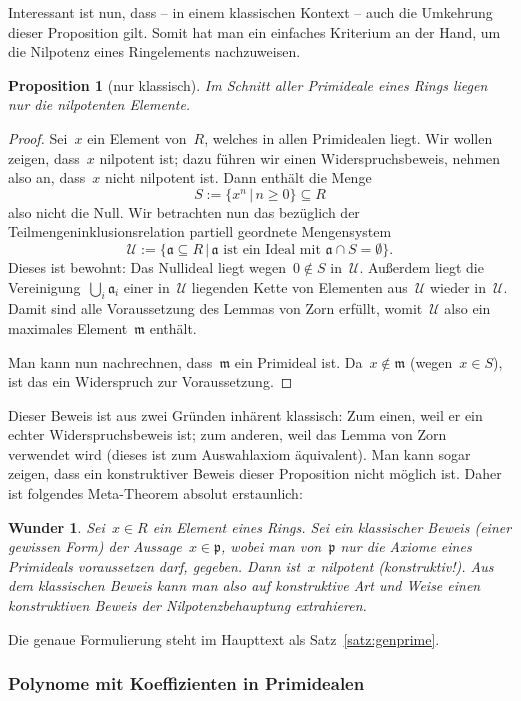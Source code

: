 \documentclass[a4paper,ngerman,12pt]{scrartcl}
\theoremstyle{definition}
\theoremstyle{plain}
\newtheorem{prop}[defn]{Proposition}
\newtheorem{wunder}[defn]{Wunder}
\theoremstyle{remark}
\renewcommand{\aa}{\mathfrak{a}}
\newcommand{\pp}{\mathfrak{p}}
\newcommand{\mm}{\mathfrak{m}}
\newcommand{\U}{\mathcal{U}}
\renewcommand{\_}{\mathpunct{.}\,}
\newcommand{\?}{\,{:}\,}
\begin{document}
Interessant ist nun, dass -- in einem klassischen Kontext -- auch die Umkehrung
dieser Proposition gilt. Somit hat man ein einfaches Kriterium an der Hand, um
die Nilpotenz eines Ringelements nachzuweisen.

\begin{prop}[nur klassisch]\label{intersectprim}%
Im Schnitt aller Primideale eines Rings liegen nur
die nilpotenten Elemente.\end{prop}
\begin{proof}Sei~$x$ ein Element von~$R$, welches in allen Primidealen liegt.
Wir wollen zeigen, dass~$x$ nilpotent ist; dazu führen wir einen
Widerspruchsbeweis, nehmen also an, dass~$x$ nicht nilpotent ist. Dann enthält
die Menge
\[ S := \{ x^n \,|\, n \geq 0 \} \subseteq R \]
also nicht die Null. Wir betrachten nun das bezüglich der
Teilmengeninklusionsrelation partiell geordnete Mengensystem
\[ \U := \{ \aa \subseteq R \,|\, \text{$\aa$ ist ein Ideal mit~$\aa \cap S =
\emptyset$} \}. \]
Dieses ist bewohnt: Das Nullideal liegt wegen~$0 \not\in S$ in~$\U$. Außerdem
liegt die Vereinigung~$\bigcup_i \aa_i$ einer in~$\U$ liegenden Kette von
Elementen aus~$\U$ wieder in~$\U$. Damit sind alle Voraussetzung des Lemmas von
Zorn erfüllt, womit~$\U$ also ein maximales Element~$\mm$ enthält.

Man kann nun nachrechnen, dass~$\mm$ ein Primideal ist. Da~$x \not\in \mm$
(wegen~$x \in S$), ist das ein Widerspruch zur Voraussetzung.
\end{proof}

Dieser Beweis ist aus zwei Gründen inhärent klassisch: Zum einen, weil
er ein echter Widerspruchsbeweis ist; zum anderen, weil das Lemma von Zorn
verwendet wird (dieses ist zum Auswahlaxiom äquivalent). Man kann sogar zeigen,
dass ein konstruktiver Beweis dieser Proposition nicht möglich ist. Daher
ist folgendes Meta-Theorem absolut erstaunlich:

\begin{wunder}Sei~$x \in R$ ein Element eines Rings. Sei ein \emph{klassischer
Beweis} (einer gewissen Form) der Aussage~$x \in \pp$, wobei man von~$\pp$ nur
die Axiome eines Primideals voraussetzen darf, gegeben. Dann ist~$x$ nilpotent
(konstruktiv!). Aus dem klassischen Beweis kann man also auf konstruktive Art
und Weise einen konstruktiven Beweis der Nilpotenzbehauptung extrahieren.
\end{wunder}

Die genaue Formulierung steht im Haupttext als Satz~\ref{satz:genprime}.


\subsubsection*{Polynome mit Koeffizienten in Primidealen}
\end{document}
